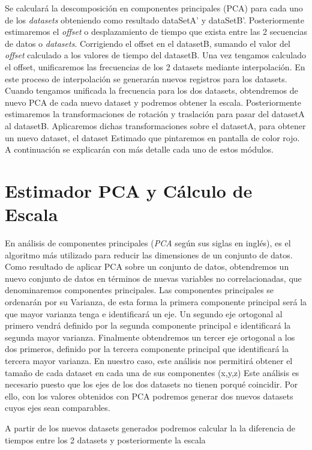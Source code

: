 Se calculará la descomposición en componentes principales (PCA) para cada uno de los \textit{datasets} obteniendo como resultado dataSetA' y dataSetB'. Posteriormente estimaremos el \textit{offset} o desplazamiento de tiempo que exista entre las 2 secuencias de datos o \textit{datasets}. Corrigiendo el offset en el datasetB, sumando el valor del \textit{offset} calculado a los valores de tiempo del datasetB. Una vez tengamos calculado el offset, unificaremos las frecuencias de los 2 datasets mediante interpolación. En este proceso de interpolación se generarán nuevos registros para los datasets.
Cuando tengamos unificada la frecuencia para los dos datasets, obtendremos de nuevo PCA de cada nuevo dataset y podremos obtener la escala.
Posteriormente estimaremos la transformaciones de rotación y traslación para pasar del datasetA al datasetB. Aplicaremos dichas transformaciones sobre el datasetA, para obtener un nuevo dataset, el dataset Estimado que pintaremos en pantalla de color rojo.
A continuación se explicarán con más detalle cada uno de estos módulos.


\section{Estimador PCA y Cálculo de Escala}
    En análisis de componentes principales (\textit{PCA} según sus siglas en inglés), es el algoritmo más utilizado para reducir las dimensiones de un conjunto de datos. Como resultado de aplicar PCA sobre un conjunto de datos, obtendremos un nuevo conjunto de datos en términos de nuevas variables no correlacionadas, que denominaremos componentes principales. Las componentes principales se ordenarán por su Varianza, de esta forma la primera componente principal será la que mayor varianza tenga e identificará un eje. Un segundo eje ortogonal al primero vendrá definido por la segunda componente principal e identificará la segunda mayor varianza. Finalmente obtendremos un tercer eje ortogonal a los dos primeros, definido por la tercera componente principal que identificará la tercera mayor varianza.
    En nuestro caso, este análisis nos permitirá obtener el tamaño de cada dataset en cada una de sus componentes (x,y,z)
	Este análisis es necesario puesto que los ejes de los dos datasets no tienen porqué coincidir. Por ello, con los valores obtenidos con PCA podremos generar dos nuevos datasets cuyos ejes sean comparables.

	A partir de los nuevos datasets generados podremos calcular la la diferencia de tiempos entre los 2 datasets y posteriormente la escala 

